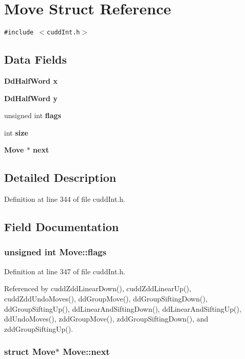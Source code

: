 \section{Move Struct Reference}
\label{structMove}
{\tt \#include $<$cudd\-Int.h$>$}

\subsection*{Data Fields}
\begin{CompactItemize}
\item 
\bf{Dd\-Half\-Word} \bf{x}
\item 
\bf{Dd\-Half\-Word} \bf{y}
\item 
unsigned int \bf{flags}
\item 
int \bf{size}
\item 
\bf{Move} $\ast$ \bf{next}
\end{CompactItemize}


\subsection{Detailed Description}




Definition at line 344 of file cudd\-Int.h.

\subsection{Field Documentation}
\subsubsection{\setlength{\rightskip}{0pt plus 5cm}unsigned int \bf{Move::flags}}\label{structMove_279868fb9de35a14b9b4a066487a5e68}




Definition at line 347 of file cudd\-Int.h.

Referenced by cudd\-Zdd\-Linear\-Down(), cudd\-Zdd\-Linear\-Up(), cudd\-Zdd\-Undo\-Moves(), dd\-Group\-Move(), dd\-Group\-Sifting\-Down(), dd\-Group\-Sifting\-Up(), dd\-Linear\-And\-Sifting\-Down(), dd\-Linear\-And\-Sifting\-Up(), dd\-Undo\-Moves(), zdd\-Group\-Move(), zdd\-Group\-Sifting\-Down(), and zdd\-Group\-Sifting\-Up().
\subsubsection{\setlength{\rightskip}{0pt plus 5cm}struct \bf{Move}$\ast$ \bf{Move::next}}\label{structMove_66ffd949928e547d99bd3192616f2c5e}




